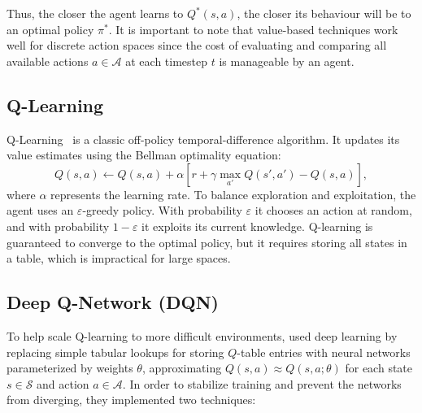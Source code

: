 Thus, the closer the agent learns to $Q^*(s, a)$, the closer its behaviour will be to an optimal policy $\pi^*$. It is important to note that value-based techniques work well for discrete action spaces since the cost of evaluating and comparing all available actions $a \in \mathcal{A}$ at each timestep $t$ is manageable by an agent.

\subsection{Q-Learning}

Q-Learning~\citep{watkins1992qlearning} is a classic off-policy temporal-difference algorithm. It updates its value estimates using the Bellman optimality equation:
\begin{equation}
    Q(s,a) \leftarrow Q(s,a) + \alpha \left[ r + \gamma \max_{a'} Q(s', a') - Q(s,a) \right],
    \label{eq:qlearning}
\end{equation}
where $\alpha$ represents the learning rate. To balance exploration and exploitation, the agent uses an $\varepsilon$-greedy policy. With probability $\varepsilon$ it chooses an action at random, and with probability $1 - \varepsilon$ it exploits its current knowledge. Q-learning is guaranteed to converge to the optimal policy, but it requires storing all states in a table, which is impractical for large spaces.

\subsection{Deep Q-Network (DQN)}

To help scale Q-learning to more difficult environments, \citet{mnih2015} used deep learning by replacing simple tabular lookups for storing $Q$-table entries with neural networks parameterized by weights $\theta$, approximating $Q(s, a) \approx Q(s, a; \theta)$ for each state $s \in \mathcal{S}$ and action $a \in \mathcal{A}$. In order to stabilize training and prevent the networks from diverging, they implemented two techniques:

